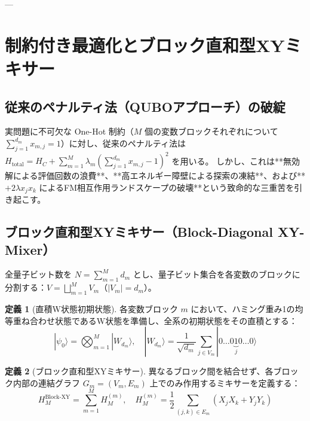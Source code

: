 \documentclass[11pt,a4paper]{ltjsarticle}
\theoremstyle{definition}
\newtheorem{definition}{定義}[section]
\theoremstyle{plain}
\theoremstyle{remark}
\newcommand{\ket}[1]{|#1\rangle}
\begin{document}
---

\section{制約付き最適化とブロック直和型XYミキサー}

\subsection{従来のペナルティ法（QUBOアプローチ）の破綻}
実問題に不可欠な One-Hot 制約（$M$ 個の変数ブロックそれぞれについて $\sum_{j=1}^{d_m} x_{m, j} = 1$）に対し、従来のペナルティ法は $H_{\text{total}} = H_C + \sum_{m=1}^M \lambda_m ( \sum_{j=1}^{d_m} x_{m, j} - 1 )^2$ を用いる。
しかし、これは**無効解による評価回数の浪費**、**高エネルギー障壁による探索の凍結**、および**$+2\lambda x_j x_k$ によるFM相互作用ランドスケープの破壊**という致命的な三重苦を引き起こす。

\subsection{ブロック直和型XYミキサー（Block-Diagonal XY-Mixer）}
全量子ビット数を $N = \sum_{m=1}^M d_m$ とし、量子ビット集合を各変数のブロックに分割する：$V = \bigsqcup_{m=1}^M V_m$（$|V_m| = d_m$）。

\begin{definition}[直積W状態初期状態]
各変数ブロック $m$ において、ハミング重み1の均等重ね合わせ状態であるW状態を準備し、全系の初期状態をその直積とする：
\begin{equation}
\ket{\psi_0} = \bigotimes_{m=1}^M \ket{W_{d_m}}, \quad \ket{W_{d_m}} = \frac{1}{\sqrt{d_m}} \sum_{j \in V_m} \ket{0 \dots 0 \underbrace{1}_{j} 0 \dots 0}
\end{equation}
\end{definition}

\begin{definition}[ブロック直和型XYミキサー]
異なるブロック間を結合せず、各ブロック内部の連結グラフ $G_m = (V_m, E_m)$ 上でのみ作用するミキサーを定義する：
\begin{equation}
H_M^{\text{Block-XY}} = \sum_{m=1}^M H_M^{(m)}, \quad H_M^{(m)} = \frac{1}{2} \sum_{(j, k) \in E_m} (X_j X_k + Y_j Y_k)
\end{equation}
\end{definition}
\end{document}
